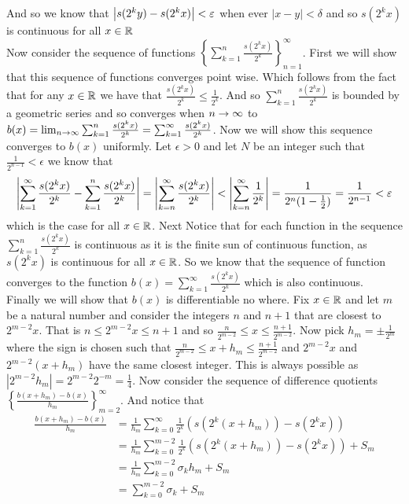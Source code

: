 \documentclass[12pt]{amsart}
\begin{document}
\begin{itemize}
      And so we know that $\left\vert s(2^ky)-s(2^kx) \right\vert<\varepsilon$ when ever $|x-y|<\delta$
      and so $s(2^kx)$ is continuous for all $x\in \mathbb{R}$\\

      Now consider the sequence of functions
      $\displaystyle{\left\{\sum_{k=1}^n\frac{s(2^kx)}{2^k}\right\}_{n=1}^{\infty}}$.
      First we will show that this sequence of functions converges point wise. Which
      follows from the fact that for any $x\in \mathbb{R}$ we have that
      $\frac{s(2^kx)}{2^k}\leq \frac{1}{2^k}$. And so
      $\sum_{k=1}^n\frac{s(2^kx)}{2^k}$ is bounded by a geometric series and so
      converges when $n\rightarrow\infty$ to
      $b(x)=\lim_{n\rightarrow\infty}\sum_{k=1}^n\frac{s(2^kx)}{2^k}=\sum_{k=1}^\infty\frac{s(2^kx)}{2^k}$.
      Now we will show this sequence converges to $b(x)$ uniformly. Let $\epsilon>0$
      and let $N$ be an integer such that $\frac{1}{2^{n-1}}<\epsilon$ we know that
      \[\left\vert \sum_{k=1}^\infty\frac{s(2^kx)}{2^k}-\sum_{k=1}^n\frac{s(2^kx)}{2^k} \right\vert=\left\vert \sum_{k=n}^\infty\frac{s(2^kx)}{2^k} \right\vert<\left\vert \sum_{k=n}^\infty\frac{1}{2^k} \right\vert=\frac{1}{2^n(1-\frac{1}{2})}=\frac{1}{2^{n-1}}<\varepsilon\]
      which is the case for all $x\in\mathbb{R}$. Next Notice that for each function in the
      sequence $\sum_{k=1}^n\frac{s(2^kx)}{2^k}$ is continuous as it is the finite
      sun of continuous function, as $s(2^kx)$ is continuous for all $x\in\mathbb{R}$. So we
      know that the sequence of function converges to the function
      $b(x)=\sum_{k=1}^\infty\frac{s(2^kx)}{2^k}$ which is also continuous.\\

      Finally we will show that $b(x)$ is differentiable no where. Fix $x\in \mathbb{R}$ and
      let $m$ be a natural number and consider the integers $n$ and $n+1$ that are
      closest to $2^{m-2}x$. That is $n\leq 2^{m-2}x\leq n+1$ and so
      $\frac{n}{2^{m-2}}\leq x\leq \frac{n+1}{2^{m-2}}$. Now pick
      $h_m=\pm\frac{1}{2^m}$ where the sign is chosen such that
      $\frac{n}{2^{m-2}}\leq x+h_m\leq \frac{n+1}{2^{m-2}}$ and $2^{m-2}x$ and $2^{m-2}(x+h_m)$ have the same closest integer. This is always possible as  $|2^{m-2}h_m|=2^{m-2}2^{-m}=\frac{1}{4}$. %
      Now consider the sequence of difference quotients
      $\left\{\frac{b(x+h_m)-b(x)}{h_m}\right\}_{m=2}^\infty$. And notice that
      \begin{align}
         \frac{b(x+h_m)-b(x)}{h_m} & =\frac{1}{h_m}\sum_{k=0}^{\infty}\frac{1}{2^k}\left(s(2^k(x+h_m))-s(2^kx)\right) \\
                                   & =\frac{1}{h_m}\sum_{k=0}^{m-2}\frac{1}{2^k}\left(s(2^k(x+h_m))-s(2^kx)\right) + S_m     \\
                                   & =\frac{1}{h_m}\sum_{k=0}^{m-2}\sigma_k h_m  + S_m                                       \\
                                   & =\sum_{k=0}^{m-2}\sigma_k +S_m
      \end{align}


\end{itemize}
\end{document}
